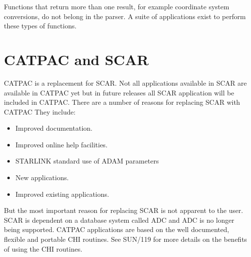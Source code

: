 Functions that return more than one result, for example coordinate system
conversions, do not belong in the parser. A suite of applications exist
to perform these types of functions.

\section{CATPAC and SCAR}

CATPAC is a replacement for SCAR. Not all applications available in SCAR are
available in CATPAC yet but in future releases all SCAR application will be 
included in CATPAC. There are a number of reasons for replacing SCAR with 
CATPAC
They include:

\begin{itemize}

\item Improved documentation.

\item Improved online help facilities.

\item STARLINK standard use of ADAM parameters

\item New applications.

\item Improved existing applications.

\end{itemize}

But the most important reason for replacing SCAR is not apparent to the user.
SCAR is dependent on a database system called ADC and ADC is no longer  being
supported. CATPAC applications are based on the well documented,  flexible and
portable CHI routines. See SUN/119 for more details on the benefits of using
the CHI routines.


